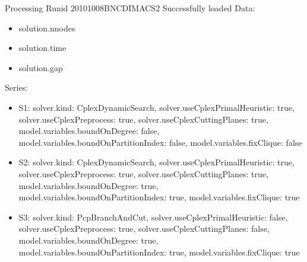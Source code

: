 \documentclass[landscape, 12pt]{report}
\begin{document}
Processing Runid 20101008BNCDIMACS2
 Successfully loaded
Data:
\begin{itemize}
\item solution.nnodes
\item solution.time
\item solution.gap
\end{itemize}
Series:
\begin{itemize}
\item S1: solver.kind: CplexDynamicSearch, solver.useCplexPrimalHeuristic: true, solver.useCplexPreprocess: true, solver.useCplexCuttingPlanes: true, model.variables.boundOnDegree: false, model.variables.boundOnPartitionIndex: false, model.variables.fixClique: false
\item S2: solver.kind: CplexDynamicSearch, solver.useCplexPrimalHeuristic: true, solver.useCplexPreprocess: true, solver.useCplexCuttingPlanes: true, model.variables.boundOnDegree: true, model.variables.boundOnPartitionIndex: true, model.variables.fixClique: true
\item S3: solver.kind: PcpBranchAndCut, solver.useCplexPrimalHeuristic: false, solver.useCplexPreprocess: true, solver.useCplexCuttingPlanes: false, model.variables.boundOnDegree: true, model.variables.boundOnPartitionIndex: true, model.variables.fixClique: true
\end{itemize}
\end{document}
